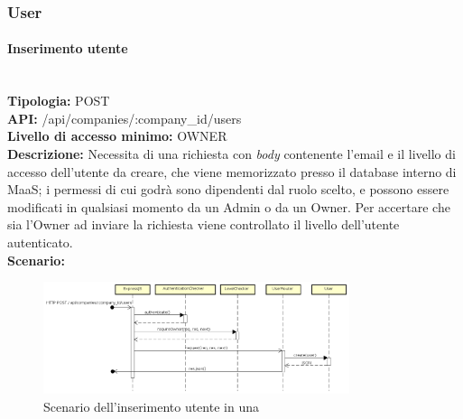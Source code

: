 \newpage
\subsubsection{User}

\paragraph{Inserimento utente}\mbox{}\\
\textbf{Tipologia:} POST \\
\textbf{API:} /api/companies/:company\_id/users \\
\textbf{Livello di accesso minimo:} OWNER \\
\textbf{Descrizione:} Necessita di una richiesta con \textit{body} contenente l'email e il livello di accesso dell'utente da creare, che viene memorizzato presso il database interno di MaaS; i permessi di cui godrà sono dipendenti dal ruolo scelto, e possono essere modificati in qualsiasi momento da un Admin o da un Owner. Per accertare che sia l'Owner ad inviare la richiesta viene controllato il livello dell'utente autenticato. \\
\textbf{Scenario:} 
\begin{figure}[H]
\centering
\includegraphics[width=0.8\textwidth]{res/sections/backend/sequence/(POST)user.png}
\caption{Scenario dell'inserimento utente in una }
\end{figure}

\newpage
